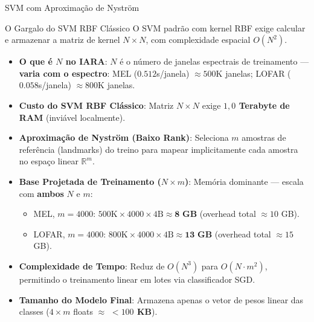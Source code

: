 \documentclass{beamer}
\begin{document}
\begin{frame}{SVM com Aproximação de Nyström}
    \scriptsize
    \begin{block}{O Gargalo do SVM RBF Clássico}
        O SVM padrão com kernel RBF exige calcular e armazenar a matriz de kernel $N \times N$, com complexidade espacial $O(N^2)$.
        \begin{itemize}
            \scriptsize
            \item \textbf{O que é $N$ no IARA}: $N$ é o número de janelas espectrais de treinamento — \textbf{varia com o espectro}: MEL ($0.512$s/janela) $\approx 500$K janelas; LOFAR ($0.058$s/janela) $\approx 800$K janelas.
            \item \textbf{Custo do SVM RBF Clássico}: Matriz $N \times N$ exige \textbf{$1,0$ Terabyte de RAM} (inviável localmente).
        \end{itemize}
    \end{block}

    \scriptsize
    \begin{itemize}
        \setlength{\itemsep}{2pt}
        \item \textbf{Aproximação de Nyström (Baixo Rank)}: Seleciona $m$ amostras de referência (landmarks) do treino para mapear implicitamente cada amostra no espaço linear $\mathbb{R}^m$.
        \item \textbf{Base Projetada de Treinamento ($N \times m$)}: Memória dominante — escala com \textbf{ambos} $N$ e $m$:
        \begin{itemize}
            \tiny
            \setlength{\itemsep}{1pt}
            \item MEL, $m=4000$: $500\text{K} \times 4000 \times 4\text{B} \approx \mathbf{8\text{ GB}}$ (overhead total $\approx 10$ GB).
            \item LOFAR, $m=4000$: $800\text{K} \times 4000 \times 4\text{B} \approx \mathbf{13\text{ GB}}$ (overhead total $\approx 15$ GB).
        \end{itemize}
        \item \textbf{Complexidade de Tempo}: Reduz de $O(N^3)$ para $O(N \cdot m^2)$, permitindo o treinamento linear em lotes via classificador SGD.
        \item \textbf{Tamanho do Modelo Final}: Armazena apenas o vetor de pesos linear das classes ($4 \times m$ floats $\approx$ \textbf{$<100$ KB}).
    \end{itemize}
\end{frame}
\end{document}
